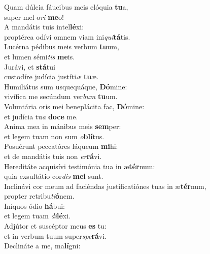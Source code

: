 \oddverse Quam dúlcia fáucibus meis elóquia \textbf{tu}a,~\*\\
\oddverse super mel o\textit{ri} \textbf{me}o!\\
\evenverse A mandátis tuis intel\textbf{lé}xi:~\*\\
\evenverse proptérea odívi omnem viam ini\textit{qui}\textbf{tá}tis.\\
\oddverse Lucérna pédibus meis verbum \textbf{tu}um,~\*\\
\oddverse et lumen sémi\textit{tis} \textbf{me}is.\\
\evenverse Jurávi, et \textbf{stá}tui~\*\\
\evenverse custodíre judícia justíti\textit{æ} \textbf{tu}æ.\\
\oddverse Humiliátus sum usquequáque, \textbf{Dó}mine:~\*\\
\oddverse vivífica me secúndum ver\textit{bum} \textbf{tu}um.\\
\evenverse Voluntária oris mei beneplácita fac, \textbf{Dó}mine:~\*\\
\evenverse et judícia tu\textit{a} \textbf{do}\textbf{ce} me.\\
\oddverse Anima mea in mánibus meis \textbf{sem}per:~\*\\
\oddverse et legem tuam non sum \textit{o}\textbf{blí}tus.\\
\evenverse Posuérunt peccatóres láqueum \textbf{mi}hi:~\*\\
\evenverse et de mandátis tuis non \textit{er}\textbf{rá}vi.\\
\oddverse Hereditáte acquisívi testimónia tua in æ\textbf{tér}num:~\*\\
\oddverse quia exsultátio cor\textit{dis} \textbf{me}\textbf{i} sunt.\\
\evenverse Inclinávi cor meum ad faciéndas justificatiónes tuas in æ\textbf{tér}num,~\*\\
\evenverse propter retribu\textit{ti}\textbf{ó}nem.\\
\oddverse Iníquos ódio \textbf{há}bui:~\*\\
\oddverse et legem tuam \textit{di}\textbf{lé}xi.\\
\evenverse Adjútor et suscéptor meus \textbf{es} tu:~\*\\
\evenverse et in verbum tuum super\textit{spe}\textbf{rá}vi.\\
\oddverse Declináte a me, ma\textbf{lí}gni:~\*\\
